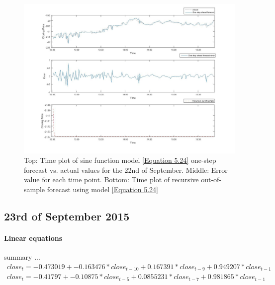 \documentclass[13pt]{report}
\begin{document}
\begin{figure}[H]
\centering
\label{VWNonlinear22fig}
\includegraphics[width=\textwidth]{22nonlinear}
\caption{Top: Time plot of sine function model \ref{Equation 5.24} one-step forecast vs. actual values for the 22nd of September. Middle: Error value for each time point. Bottom: Time plot of recursive out-of-sample forecast using model \ref{Equation 5.24}}
\end{figure}

\subsection{23rd of September 2015}
\paragraph{Linear equations}\hfill \break
summary ...
\begin{equation}
\begin{align*}
close_{t} = -0.473019 + -0.163476 * close_{t-10} + 0.167391 * close_{t-9} + 0.949207 * close_{t-1} 
\end{align*}
\label{Equation 5.25}
\end{equation}
\begin{equation}
\begin{align*}
close_{t} = -0.41797 + -0.10875 * close_{t-5} + 0.0855231 * close_{t-7} + 0.981865 * close_{t-1}
\end{align*}
\label{Equation 5.26}
\end{equation}
\end{document}
